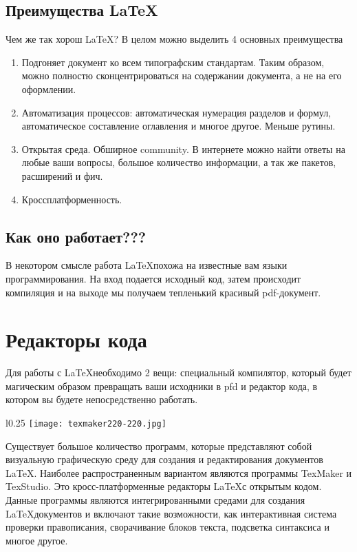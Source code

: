     \subsection{Преимущества \LaTeX}

    Чем же так хорош \LaTeX? В целом можно выделить 4 основных преимущества

    \begin{enumerate}
        \item Подгоняет документ ко всем типографским стандартам. Таким образом, можно полностю сконцентрироваться на содержании документа, а не на его оформлении.
        \item Автоматизация процессов: автоматическая нумерация разделов и формул, автоматическое составление оглавления и многое другое. Меньше рутины.
        \item Открытая среда. Обширное community. В интернете можно найти ответы на любые ваши вопросы, большое количество информации, а так же пакетов, расширений и фич.
        \item Кроссплатформенность.
    \end{enumerate}

    \subsection{Как оно работает???}

    В некотором смысле работа \LaTeX похожа на известные вам языки программирования. На вход подается исходный код, затем происходит компиляция и на выходе мы получаем тепленький красивый pdf-документ.


    \section{Редакторы кода}

    Для работы с \LaTeX необходимо 2 вещи: специальный компилятор, который будет магическим образом превращать ваши исходники в pfd и редактор кода, в котором вы будете непосредственно работать.
    
    \begin{wrapfigure}{l}{0.25\textwidth}
        \centering
        \texttt{[image: texmaker220-220.jpg]}
        \caption{}
    \end{wrapfigure}

    Существует большое количество программ, которые представляют собой визуальную графическую среду для создания и редактирования документов \LaTeX.
    Наиболее распространенным вариантом являются программы TexMaker и TexStudio. Это кросс-платформенные редакторы \LaTeX с открытым кодом. Данные программы являются интегрированными средами для создания \LaTeX документов и включают такие возможности, как интерактивная система проверки правописания, сворачивание блоков текста, подсветка синтаксиса и многое другое.

